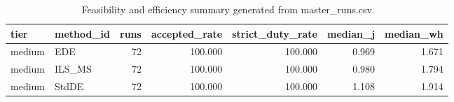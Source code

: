 \begin{table}[!t]
\centering
\caption{Feasibility and efficiency summary generated from master_runs.csv}
\label{tab:feasibility_summary_generated}
\begin{tabular}{llrrrrr}
\toprule
tier & method_id & runs & accepted_rate & strict_duty_rate & median_j & median_wh \\
\midrule
medium & EDE & 72 & 100.000 & 100.000 & 0.969 & 1.671 \\
medium & ILS_MS & 72 & 100.000 & 100.000 & 0.980 & 1.794 \\
medium & StdDE & 72 & 100.000 & 100.000 & 1.108 & 1.914 \\
\bottomrule
\end{tabular}

\end{table}